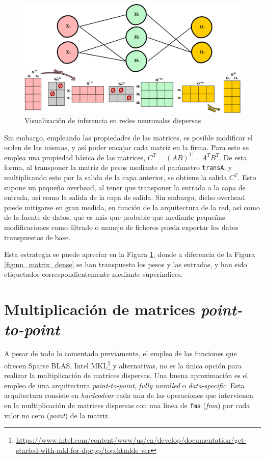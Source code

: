 \begin{figure}[h!]
    \centering
    \includegraphics[width=\textwidth]{img/neural_network_matrix_sparse/neural_network_matrix_sparse.png}
    \caption{Visualización de inferencia en redes neuronales dispersas}
    \label{fig:nn_matrix_sparse}
\end{figure}

Sin embargo, empleando las propiedades de las matrices, es posible modificar el orden de las mismas, y así poder encajar cada matriz en la firma. Para esto se emplea una propiedad básica de las matrices, $C^{T} = (AB)^{T} = A^{T}B^{T}$. De esta forma, al transponer la matriz de pesos mediante el parámetro \texttt{transA}, y multiplicando esto por la salida de la capa anterior, se obtiene la salida $C^{T}$. Esto supone un pequeño overhead, al tener que transponer la entrada a la capa de entrada, así como la salida de la capa de salida. Sin embargo, dicho overhead puede mitigarse en gran medida, en función de la arquitectura de la red, así como de la fuente de datos, que es más que probable que mediante pequeñas modificaciones como filtrado o manejo de ficheros pueda exportar los datos transpuestos de base.

Esta estrategia se puede apreciar en la Figura \ref{fig:nn_matrix_sparse}, donde a diferencia de la Figura \ref{fig:nn_matrix_dense} se han transpuesto los pesos y las entradas, y han sido etiquetados correspondientemente mediante superíndices.

\section{Multiplicación de matrices \textit{point-to-point}}
\label{sec:multiplicacion_point_to_point}
A pesar de todo lo comentado previamente, el empleo de las funciones que ofrecen Sparse BLAS, Intel MKL\footnote{\url{https://www.intel.com/content/www/us/en/develop/documentation/get-started-with-mkl-for-dpcpp/top.htmlde ver}} y alternativas, no es la única opción para realizar la multiplicación de matrices dispersas. Una buena aproximación es el empleo de una arquitectura \textit{point-to-point}, \textit{fully unrolled} o \textit{data-specific}. Esta arquitectura consiste en \textit{hardcodear} cada una de las operaciones que intervienen en la multiplicación de matrices dispersas con una línea de \texttt{\acrshort{fma}} (\textit{\acrlong{fma}}) por cada valor no cero (\textit{point}) de la matriz.

